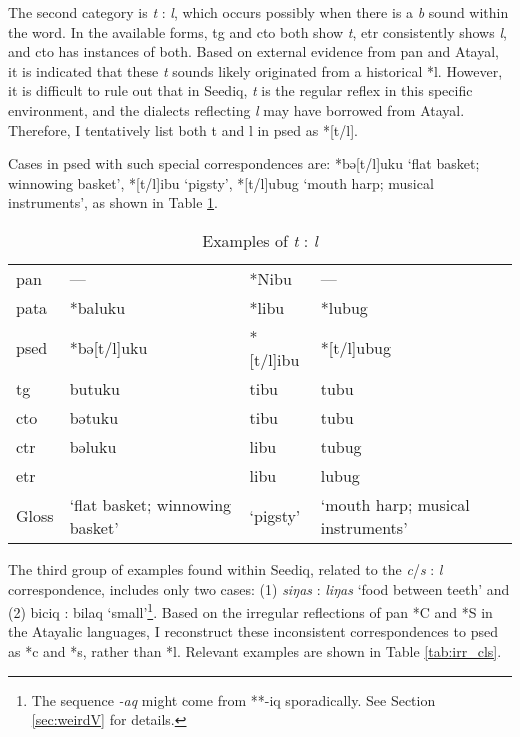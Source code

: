 The second category is \textit{t} : \textit{l}, which occurs possibly when there is a \textit{b} sound within the word. In the available forms, \acl{tg} and \acl{cto} both show \textit{t}, \acl{etr} consistently shows \textit{l}, and \acl{cto} has instances of both. Based on external evidence from \acl{pan} and Atayal, it is indicated that these \textit{t} sounds likely originated from a historical *l. However, it is difficult to rule out that in Seediq, \textit{t} is the regular reflex in this specific environment, and the dialects reflecting \textit{l} may have borrowed from Atayal. Therefore, I tentatively list both t and l in \acl{psed} as *[t/l].

Cases in \acl{psed} with such special correspondences are: *bə[t/l]uku `flat basket; winnowing basket', *[t/l]ibu `pigsty', *[t/l]ubug `mouth harp; musical instruments', as shown in Table \ref{tab:irr_tl}.

\begin{table}[!htbp]
\centering
\caption{Examples of \textit{t} : \textit{l}}
\label{tab:irr_tl}
\begin{tabular}{llll}
\hline
\acs{pan}  & ---                             & *Nibu    & ---                               \\
\acs{pata} & *baluku                         & *libu    & *lubug                            \\ \hline
\ac{psed}  & *bə[t/l]uku                     & *[t/l]ibu & *[t/l]ubug                        \\ \hdashline
\ac{tg}    & butuku                          & tibu      & tubu                              \\
\ac{cto}   & bətuku                          & tibu      & tubu                              \\
\ac{ctr}   & bəluku                          & libu      & tubug                             \\
\ac{etr}   &                                 & libu      & lubug                             \\ \hline
Gloss      & `flat basket; winnowing basket' & `pigsty'  & `mouth harp; musical instruments' \\ \hline
\end{tabular}
\end{table}

The third group of examples found within Seediq, related to the \textit{c}/\textit{s} : \textit{l} correspondence, includes only two cases: (1) \textit{siŋas} : \textit{liŋas} `food between teeth' and (2) biciq : bilaq `small'\footnote{The sequence \textit{-aq} might come from **-iq sporadically. See Section \ref{sec:weirdV} for details.}. Based on the irregular reflections of \acl{pan} *C and *S in the Atayalic languages, I reconstruct these inconsistent correspondences to \acl{psed} as *c and *s, rather than *l. Relevant examples are shown in Table \ref{tab:irr_cls}.

